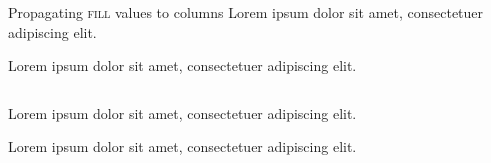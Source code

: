 \documentclass[xcolor=dvipsnames,compress,9pt]{beamer}
\begin{document}
\begin{frame}{Propagating \textsc{fill} values to columns}
Lorem ipsum dolor sit amet, consectetuer adipiscing elit.
\par
Lorem ipsum dolor sit amet, consectetuer adipiscing elit.
\vspace*{\parskip}
\begin{columns}[t]
\begin{column}{\textwidth}
Lorem ipsum dolor sit amet, consectetuer adipiscing elit.
\par
Lorem ipsum dolor sit amet, consectetuer adipiscing elit.
\end{column}
\end{columns}
\end{frame}
\end{document}
